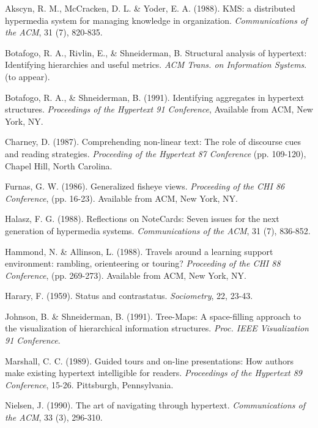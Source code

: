 \documentclass[twocolumn,10pt]{article}
\begin{document}
\begin{thebibliography}{99}

  Akscyn, R. M., McCracken, D. L. \& Yoder, E. A. (1988).
  KMS: a distributed hypermedia system for managing knowledge in
  organization.
  {\em Communications of the ACM}, 31 (7), 820-835.

  Botafogo, R. A., Rivlin, E., \& Shneiderman, B. Structural
  analysis of hypertext: Identifying hierarchies and useful metrics.
  {\em ACM Trans. on Information Systems}. (to appear).

  Botafogo, R. A., \& Shneiderman, B. (1991).
  Identifying aggregates in hypertext structures.
  {\em Proceedings of the Hypertext 91 Conference}, 
  Available from ACM, New York, NY.

  Charney, D. (1987). Comprehending non-linear text: The role of discourse
  cues and reading strategies.
  {\em Proceeding of the Hypertext 87 Conference}
  (pp. 109-120),
  Chapel Hill, North Carolina.

  Furnas, G. W. (1986). Generalized fisheye views.
  {\em Proceeding of the CHI 86 Conference},
  (pp. 16-23). Available from ACM, New York, NY.

  Halasz, F. G. (1988). Reflections on NoteCards: Seven issues
  for the next generation of hypermedia systems. 
  {\em Communications of the ACM}, 31 (7), 836-852.

  Hammond, N. \& Allinson, L. (1988).
  Travels around a learning support environment: rambling,
  orienteering or touring?
  {\em Proceeding of the CHI 88 Conference},
  (pp. 269-273). Available from ACM, New York, NY.

  Harary, F. (1959). Status and contrastatus. {\em Sociometry},
  22, 23-43.

  Johnson, B. \& Shneiderman, B. (1991).
  Tree-Maps: A space-filling approach to the visualization of 
  hierarchical information structures.
  {\em Proc. IEEE Visualization 91 Conference}.

  Marshall, C. C. (1989). Guided tours and on-line presentations: How
  authors make existing hypertext intelligible for readers.
  {\em Proceedings of the Hypertext 89 Conference}, 15-26. Pittsburgh,
  Pennsylvania.

  Nielsen, J. (1990). The art of navigating through hypertext.
  {\em Communications of the ACM}, 33 (3), 296-310.


\end{thebibliography}
\end{document}
